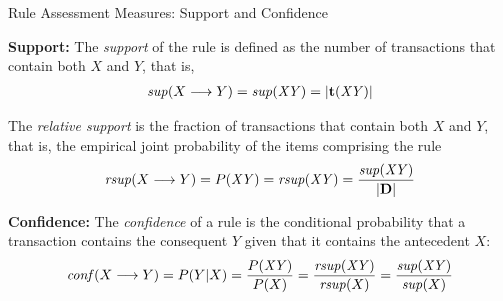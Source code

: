 
\date{Chap.\ 12: Pattern and Rule Assessment}

\begin{frame}
\titlepage
\end{frame}


\newcommand{\lift}{\mathit{lift}}
\newcommand{\leverage}{leverage}
\newcommand{\oddsratio}{oddsratio}
\newcommand{\jaccard}{jaccard}
\newcommand{\conviction}{conv}
\newcommand{\cover}{cover}
\newcommand{\productive}{productive}

\begin{frame}{Rule Assessment Measures: Support and Confidence}

{\bf Support:}
The {\em support} of the rule  is def\/{i}ned as the
number of transactions that contain both $X$ and $Y$, that is,
\begin{align*}
  \supp(X \arule Y) = \supp(\mathit{XY}) = \card{\vT(\mathit{XY})}
\end{align*}

\medskip
The {\em relative support} is
the fraction of transactions that contain both $X$
and $Y$, that is, the empirical
joint probability of the items comprising the rule
\begin{align*}
  \rsupp(X\arule Y) = P(\mathit{XY}) = \rsupp(\mathit{XY}) = \frac{\supp(\mathit{XY})}{\card{\bD}}
\end{align*}

\bigskip
{\bf Conf\/{i}dence:}
The {\em conf\/{i}dence} of a rule
is the conditional probability that
a transaction contains the consequent $Y$ given that it contains the
antecedent $X$:
\begin{align*}
\conff(X \arule Y) = P(Y|X) = \frac{P(\mathit{XY})}{P(X)} =
\frac{\rsupp(\mathit{XY})}{\rsupp (X)} =
\frac{\supp(\mathit{XY})}{\supp (X)}
\end{align*}
\end{frame}



